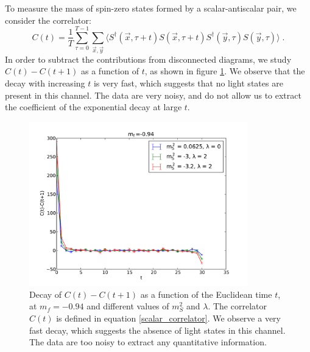 To measure the mass of spin-zero states formed by a scalar-antiscalar pair, we consider the correlator:
\begin{equation}
C(t) = \frac{1}{T} \sum_{\tau=0}^{T-1} \sum_{\vec x,\vec y} \langle S^{\dagger}(\vec x,\tau + t) S(\vec x, \tau + t) S^{\dagger}(\vec y,\tau) S(\vec y,\tau) \rangle \; .
\label{scalar_correlator}
\end{equation}
%
In order to subtract the contributions from disconnected diagrams, we study $C(t)-C(t+1)$ as a function of $t$, as shown  in figure \ref{spectrum_scalar}. We observe that the decay with increasing $t$ is very fast, which suggests that no light states are present in this channel. The data are very noisy, and do not allow us to extract the coefficient of the exponential decay at large $t$.
\begin{figure}[thb] 
\begin{center}
  \includegraphics[width=9.5cm,clip]{pics/spectrum_scalar}  
  \end{center}
  \caption{Decay of $C(t) - C(t+1)$ as a function of the Euclidean time $t$, at $m_f = -0.94$ and different values of $m_S^2$ and $\lambda$. The correlator $C(t)$ is defined in equation \ref{scalar_correlator}. We observe a very fast decay, which suggests the absence of light states in this channel. The data are too noisy to extract any quantitative information.}
  \label{spectrum_scalar}
\end{figure}


